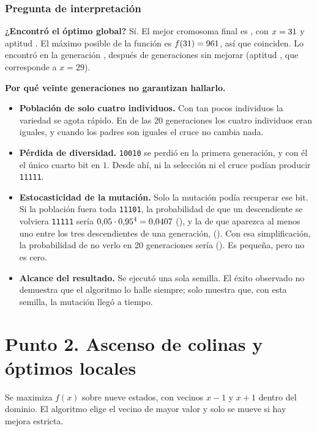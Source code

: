 \documentclass[12pt,a4paper]{article}
\begin{document}
\subsubsection{Pregunta de interpretación}
\label{sec:p1-interpretacion}

\textbf{¿Encontró el óptimo global?} Sí. El mejor cromosoma final es
\PunoMejor{}, con $x=31$ y aptitud \PunoAptitud{}. El máximo posible de
la función es $f(31)=961$, así que coinciden. Lo encontró en la
generación \PunoPrimeraGen{}, después de \PunoGenAntes{} generaciones sin
mejorar (aptitud \PunoMeseta{}, que corresponde a $x=29$).

\textbf{Por qué veinte generaciones no garantizan hallarlo.}
\begin{itemize}
  \item \textbf{Población de solo cuatro individuos.} Con tan pocos
  individuos la variedad se agota rápido. En \PunoGenUniformes{} de las 20
  generaciones los cuatro individuos eran iguales, y cuando los padres son
  iguales el cruce no cambia nada.
  \item \textbf{Pérdida de diversidad.} \texttt{10010} se perdió en la primera
  generación, y con él el único cuarto bit en $1$. Desde ahí, ni la
  selección ni el cruce podían producir \texttt{11111}.
  \item \textbf{Estocasticidad de la mutación.} Solo la mutación podía
  recuperar ese bit. Si la población fuera toda \texttt{11101}, la
  probabilidad de que un descendiente se volviera \texttt{11111} sería
  $0{,}05\cdot0{,}95^4=0{,}0407$ (\PunoProbHijoPorc{}), y la de que
  aparezca al menos uno entre los tres descendientes de una generación,
  \PunoProbGen{} (\PunoProbGenPorc{}). Con esa simplificación, la
  probabilidad de no verlo en 20 generaciones sería \PunoProbSinExito{}
  (\PunoProbSinExitoPorc{}). Es pequeña, pero no es cero.
  \item \textbf{Alcance del resultado.} Se ejecutó una sola semilla. El
  éxito observado no demuestra que el algoritmo lo halle siempre; solo
  muestra que, con esta semilla, la mutación llegó a tiempo.
\end{itemize}

\section{Punto 2. Ascenso de colinas y óptimos locales}

Se maximiza $f(x)$ sobre nueve estados, con vecinos $x-1$ y $x+1$ dentro del
dominio. El algoritmo elige el vecino de mayor valor y solo se mueve si hay
mejora estricta.
\end{document}
